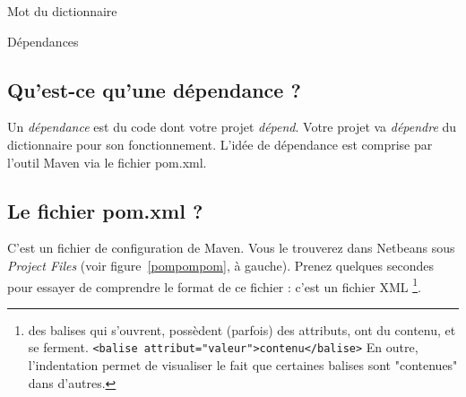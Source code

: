 \documentclass[a4paper,11pt]{style-esi/td}
\begin{document}
\begin{Exercice}{Mot du dictionnaire}
                
		\begin{infoit}{Dépendances}	
		
                \subsection*{Qu'est-ce qu'une dépendance ?}
                Un \emph{dépendance} est du code dont votre projet \emph{dépend}.
                Votre projet va \emph{dépendre} du dictionnaire pour son fonctionnement.
                L'idée de dépendance est comprise par l'outil Maven via le fichier pom.xml.
                

                \medskip
                \subsection*{Le fichier pom.xml ?}
                C'est un fichier de configuration de Maven.
                Vous le trouverez dans Netbeans sous \emph{Project Files} (voir figure~\vref{pompompom}, à gauche).
                Prenez quelques secondes pour essayer de comprendre le format de ce fichier : c'est un fichier XML%
                \footnote{
                  des balises qui s'ouvrent, possèdent (parfois) des attributs,
                  ont du contenu, et se ferment.
                  \texttt{<balise attribut="valeur">contenu</balise>}
                  En outre, l'indentation permet de visualiser le fait que certaines balises sont "contenues" dans d'autres.
                }.


\end{infoit}
\end{Exercice}
\end{document}
